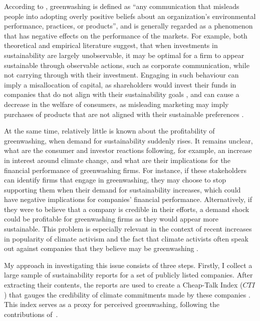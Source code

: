 \documentclass[12pt]{article}
\begin{document}
According to \textcite{lyonMeansEndGreenwash2015}, greenwashing is defined as ``any communication that misleads people into adopting overly positive beliefs about an organization's  environmental performance, practices, or products'', and is generally regarded as a phenomenon that has negative effects on the performance of the markets. For example, both theoretical \parencite{wuBadGreenwashingGood2020, cartellierCanInvestorsCurb2023} and empirical \parencite{barrageAdvertisingEnvironmentalStewardship2020, marquisScrutinyNormsSelective2016, kimGreenwashVsBrownwash2015} literature suggest, that when investments in sustainability are largely unobservable, it may be optimal for a firm to appear sustainable through observable actions, such as corporate communication, while not carrying through with their investment. Engaging in such behaviour can imply a misallocation of capital, as shareholders would invest their funds in companies that do not align with their sustainability goals \parencite{kimGreenwashVsBrownwash2015}, and can cause a decrease in the welfare of consumers, as misleading marketing may imply purchases of products that are not aligned with their sustainable preferences \parencite{barrageAdvertisingEnvironmentalStewardship2020}.

At the same time, relatively little is known about the profitability of greenwashing, when demand for sustainability suddenly rises. It remains unclear, what are the consumer and investor reactions following, for example, an increase in interest around climate change, and what are their implications for the financial performance of greenwashing firms. For instance, if these stakeholders can identify firms that engage in greenwashing, they may choose to stop supporting them when their demand for sustainability increases, which could have negative implications for companies' financial performance. Alternatively, if they were to believe that a company is credible in their efforts, a demand shock could be profitable for greenwashing firms as they would appear more sustainable. This problem is especially relevant in the context of recent increases in popularity of climate activism and the fact that climate activists often speak out against companies that they believe may be greenwashing \parencite{pew2021genz, horton2022greenwashing}.


My approach in investigating this issue consists of three steps. Firstly, I collect a large sample of sustainability reports for a set of publicly listed companies. After extracting their contents, the reports are used to create a Cheap-Talk Index ($CTI$) that gauges the credibility of climate commitments made by these companies \parencite{binglerHowCheapTalk2024}. This index serves as a proxy for perceived greenwashing, following the contributions of~\textcite{coenAreCorporateClimate2022}.
\end{document}
